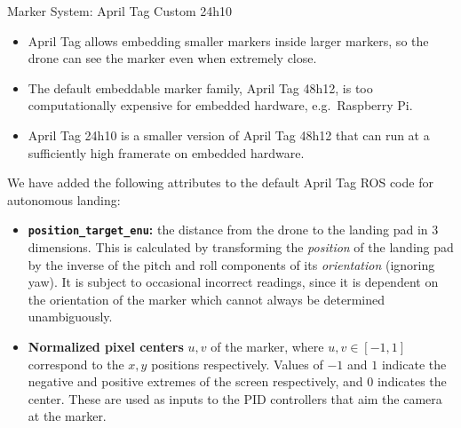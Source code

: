 \documentclass[final, 20pt]{beamer}
\newlength{\colwidth}
\begin{document}
\begin{frame}[t]
\begin{columns}[t]
\begin{column}{\colwidth}
\begin{block}{Marker System: April Tag Custom 24h10}
    \vspace{-1cm}
    \begin{itemize}
      \item April Tag allows embedding smaller markers inside larger markers,
            so the drone can see the marker even when extremely close.
      \item The default embeddable marker family, April Tag 48h12, is too computationally expensive for embedded hardware, e.g.~Raspberry Pi.
      \item April Tag 24h10 is a smaller version of April Tag 48h12 that can run at a sufficiently high framerate on embedded hardware.
    \end{itemize}
    We have added the following attributes to the default April Tag ROS code for autonomous landing:
    \begin{itemize}
      \item \textbf{\texttt{position\_target\_enu}:} the distance from the drone to the landing pad in 3 dimensions.
                    This is calculated by transforming the \textit{position} of the landing pad by
                    the inverse of the pitch and roll components of its \textit{orientation} (ignoring yaw).
                    It is subject to occasional incorrect readings, since it is dependent on the orientation of the marker which cannot always be determined unambiguously.
      \item \textbf{Normalized pixel centers} $u,v$ of the marker, where $u,v \in [-1,1]$ correspond to the $x,y$ positions respectively.
                    Values of $-1$ and $1$ indicate the negative and positive extremes of the screen respectively, and $0$ indicates the center.
                    These are used as inputs to the PID controllers that aim the camera at the marker.
    \end{itemize}





\end{block}
\end{column}
\end{columns}
\end{frame}
\end{document}
